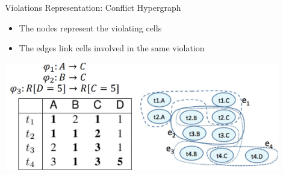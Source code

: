\documentclass[aspectratio=169]{../latex_main/tntbeamer}  %
\begin{document}
\begin{frame}[c]{Violations Representation: Conflict Hypergraph}

\begin{itemize}
    \item The nodes represent the violating cells
    \item The edges link cells involved in the same violation
\end{itemize}

    \centering\includegraphics[width=0.9\textwidth]{figure/bild21_graphs}

\end{frame}
\end{document}
